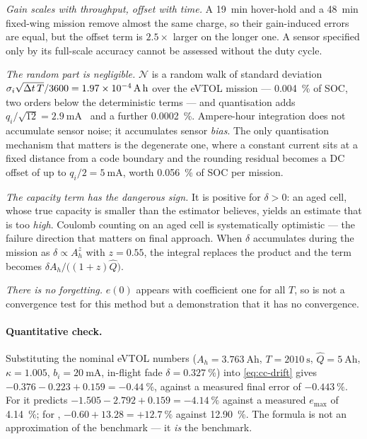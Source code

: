 \emph{Gain scales with throughput, offset with time.} A \SI{19}{\minute} hover-hold and a
\SI{48}{\minute} fixed-wing mission remove almost the same charge, so their gain-induced errors are
equal, but the offset term is $2.5\times$ larger on the longer one. A sensor specified only by its
full-scale accuracy cannot be assessed without the duty cycle.

\emph{The random part is negligible.} $\mathcal{N}$ is a random walk of standard deviation
$\sigma_i\sqrt{\Delta t\,T}/3600 = \SI{1.97e-4}{\ampere\hour}$ over the eVTOL mission --- \SI{0.004}{\percent}
of SOC, two orders below the deterministic terms --- and quantisation adds
$q_i/\sqrt{12} = \SI{2.9}{\milli\ampere}$~\cite{widrow2008quantization} and a further
\SI{0.0002}{\percent}. Ampere-hour integration does not accumulate sensor noise; it accumulates
sensor \emph{bias}. The only quantisation mechanism that matters is the degenerate one, where a
constant current sits at a fixed distance from a code boundary and the rounding residual becomes a
DC offset of up to $q_i/2 = \SI{5}{\milli\ampere}$, worth \SI{0.056}{\percent} of SOC per mission.

\emph{The capacity term has the dangerous sign.} It is positive for $\delta>0$: an aged cell, whose
true capacity is smaller than the estimator believes, yields an estimate that is too \emph{high}.
Coulomb counting on an aged cell is systematically optimistic --- the failure direction that matters
on final approach. When $\delta$ accumulates during the mission as $\delta\propto A_h^{z}$ with
$z=0.55$, the integral replaces the product and the term becomes $\delta A_h/\bigl((1+z)\hat Q\bigr)$.

\emph{There is no forgetting.} $e(0)$ appears with coefficient one for all $T$, so
 is not a convergence test for this method but a demonstration that it has no
convergence.

\paragraph{Quantitative check.} Substituting the nominal eVTOL numbers
($A_h = \SI{3.763}{\ampere\hour}$, $T=\SI{2010}{\second}$, $\hat Q = \SI{5}{\ampere\hour}$,
$\kappa = 1.005$, $b_i = \SI{20}{\milli\ampere}$, in-flight fade $\delta = \SI{0.327}{\percent}$)
into \eqref{eq:cc-drift} gives $-0.376-0.223+0.159 = -\SI{0.44}{\percent}$, against a measured final
error of $-\SI{0.443}{\percent}$. For  it predicts
$-1.505-2.792+0.159 = -\SI{4.14}{\percent}$ against a measured $e_{\max}$ of \SI{4.14}{\percent};
for , $-0.60+13.28 = +\SI{12.7}{\percent}$ against \SI{12.90}{\percent}. The formula
is not an approximation of the benchmark --- it \emph{is} the benchmark.

